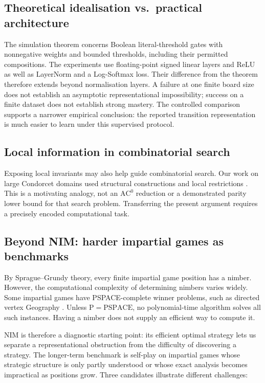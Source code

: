 \documentclass[11pt]{article}
\newcommand{\AC}{\mathrm{AC}}
\theoremstyle{plain}
\theoremstyle{definition}
\theoremstyle{remark}
\numberwithin{equation}{section}
\begin{document}
\subsection{Theoretical idealisation vs.\ practical architecture}
\label{sec:idealisation}
The simulation theorem concerns Boolean literal-threshold gates with nonnegative weights and bounded thresholds, including their permitted compositions. The experiments use floating-point signed linear layers and ReLU as well as LayerNorm and a Log-Softmax loss. Their difference from the theorem therefore extends beyond normalisation layers.
A failure at one finite board size does not establish an asymptotic representational impossibility; success on a finite dataset does not establish strong mastery. The controlled comparison supports a narrower empirical conclusion: the reported transition representation is much easier to learn under this supervised protocol.

\subsection{Local information in combinatorial search}
\label{sec:math}
Exposing local invariants may also help guide combinatorial search. Our work on large Condorcet domains used structural constructions and local restrictions \cite{karpov2023setalternating,zhou2024cdl,zhou2024phd}. This is a motivating analogy, not an $\AC^0$ reduction or a demonstrated parity lower bound for that search problem. Transferring the present argument requires a precisely encoded computational task.

\subsection{Beyond NIM: harder impartial games as benchmarks}
\label{sec:othergames}

By Sprague--Grundy theory, every finite impartial game position has a nimber. However, the computational complexity of determining nimbers varies widely. Some impartial games have PSPACE-complete winner problems, such as directed vertex Geography \cite{schaefer1978games}. Unless $\mathrm P=\mathrm{PSPACE}$, no polynomial-time algorithm solves all such instances. Having a nimber does not supply an efficient way to compute it.

NIM is therefore a diagnostic starting point: its efficient optimal strategy lets us separate a representational obstruction from the difficulty of discovering a strategy. The longer-term benchmark is self-play on impartial games whose strategic structure is only partly understood or whose exact analysis becomes impractical as positions grow. Three candidates illustrate different challenges:
\end{document}
